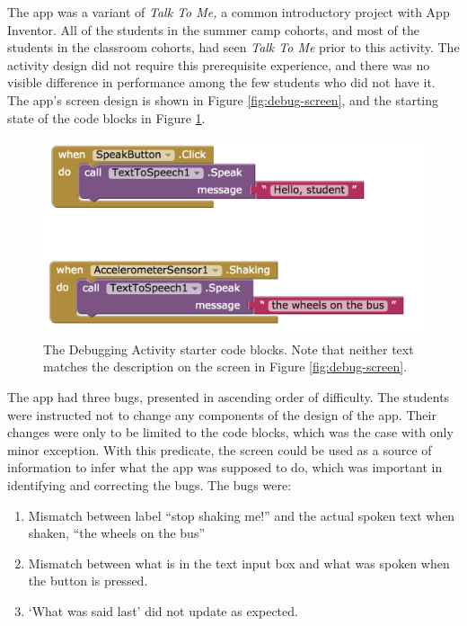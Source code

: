The app was a variant of \emph{Talk To Me,} a common introductory project with App Inventor. All of the students in the summer camp cohorts, and most of the students in the classroom cohorts, had seen \emph{Talk To Me} prior to this activity. The activity design did not require this prerequisite experience, and there was no visible difference in performance among the few students who did not have it. The app's screen design is shown in Figure \ref{fig:debug-screen}, and the starting state of the code blocks in Figure \ref{fig:debug0}.

\begin{figure}
  \centering
      \includegraphics[width=\textwidth]{images/debugActivity/debug0start}
  \caption[The Debugging Activity starter code blocks]{The Debugging Activity starter code blocks. Note that neither text matches the description on the screen in Figure \ref{fig:debug-screen}.}
  \label{fig:debug0}
\end{figure}


The app had three bugs, presented in ascending order of difficulty. The students were instructed not to change any components of the design of the app. Their changes were only to be limited to the code blocks, which was the case with only minor exception. With this predicate, the screen could be used as a source of information to infer what the app was supposed to do, which was important in identifying and correcting the bugs. The bugs were:

\begin{enumerate}
\item Mismatch between label ``stop shaking me!'' and the actual spoken text when shaken, ``the wheels on the bus''
\item Mismatch between what is in the text input box and what was spoken when the button is pressed.
\item `What was said last' did not update as expected.
\end{enumerate}

